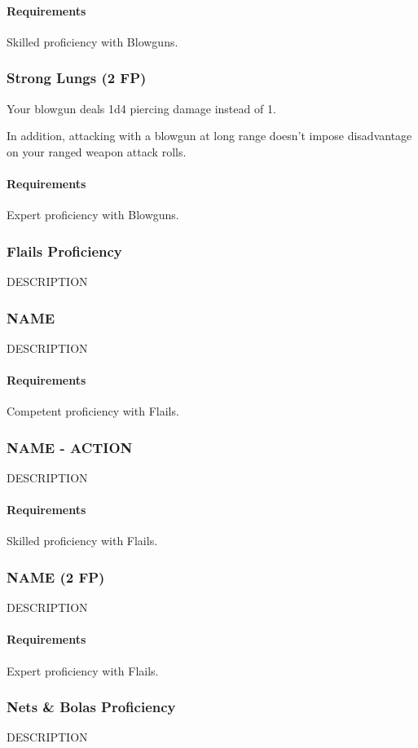     \paragraph{Requirements} Skilled proficiency with Blowguns.
\subsubsection{Strong Lungs (2 FP)} \label{feat::stronglungs}
    Your blowgun deals 1d4 piercing damage instead of 1.

    In addition, attacking with a blowgun at long range doesn't impose disadvantage on your ranged weapon attack rolls.
    \paragraph{Requirements} Expert proficiency with Blowguns.
\subsubsection{Flails Proficiency} \label{feat::name}
    DESCRIPTION
\subsubsection{NAME} \label{feat::name}
    DESCRIPTION
    \paragraph{Requirements} Competent proficiency with Flails.
\subsubsection{NAME - ACTION} \label{feat::name}
    DESCRIPTION
    \paragraph{Requirements} Skilled proficiency with Flails.
\subsubsection{NAME (2 FP)} \label{feat::name}
    DESCRIPTION
    \paragraph{Requirements} Expert proficiency with Flails.
\subsubsection{Nets \& Bolas Proficiency} \label{feat::name}
    DESCRIPTION
